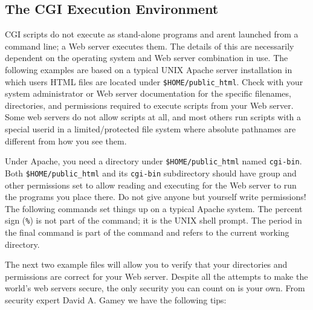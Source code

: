 {\subsection{The CGI Execution Environment}

CGI scripts do not execute as stand-alone programs and
aren{\textquotesingle}t launched from a command line; a Web server
executes them. The details of this are necessarily dependent on the
operating system and Web server combination in use. The following
examples are based on a typical UNIX Apache server installation in
which users{\textquotesingle} HTML files are located under
\texttt{\$HOME/public\_html}. Check with your system administrator or
Web server documentation for the specific filenames, directories, and
permissions required to execute scripts from your Web server. Some web
servers do not allow scripts at all, and most others run scripts with a
special userid in a limited/protected file system where absolute
pathnames are different from how you see them.

Under Apache, you need a directory under
\texttt{\$HOME/public\_html} named \texttt{cgi-bin}. Both
\texttt{\$HOME/public\_html} and its \texttt{cgi-bin} subdirectory
should have {\textquotedbl}group{\textquotedbl} and
{\textquotedbl}other{\textquotedbl} permissions set to allow
reading and executing for the Web server to run the programs you place
there. Do not give anyone but yourself write permissions! The following
commands set things up on a typical Apache system. The percent sign
(\texttt{\%}) is not part of the command; it is the UNIX shell prompt.
The period in the final command is part of the command and refers to
the current working directory.


The next two example files will allow you to verify that your
directories and permissions are correct for your Web server.
Despite all the attempts to make the world's web servers secure,
the only security you can count on is your own. From security expert
David A. Gamey we have the following tips:

}
